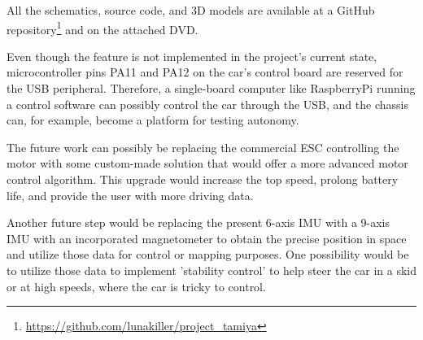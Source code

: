 All the schematics, source code, and 3D models are available at a GitHub repository\footnote{\url{https://github.com/lunakiller/project_tamiya}} and on the attached DVD.

Even though the feature is not implemented in the project's current state, microcontroller pins PA11 and PA12 on the car's control board are reserved for the USB peripheral. Therefore, a single-board computer like RaspberryPi running a control software can possibly control the car through the USB, and the chassis can, for example, become a platform for testing autonomy.

The future work can possibly be replacing the commercial ESC controlling the motor with some custom-made solution that would offer a more advanced motor control algorithm. This upgrade would increase the top speed, prolong battery life, and provide the user with more driving data.

Another future step would be replacing the present 6-axis IMU with a 9-axis IMU with an incorporated magnetometer to obtain the precise position in space and utilize those data for control or mapping purposes. One possibility would be to utilize those data to implement 'stability control' to help steer the car in a skid or at high speeds, where the car is tricky to control.